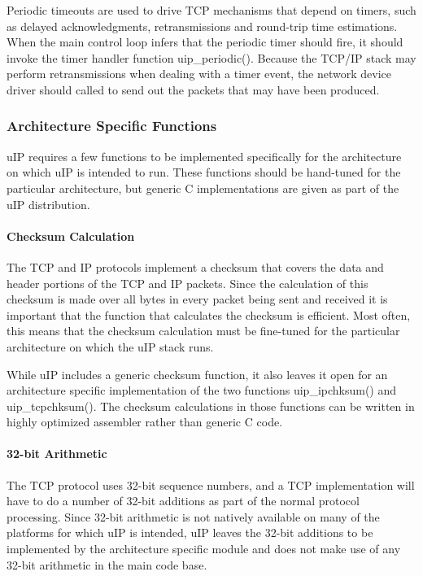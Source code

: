 \-Periodic timeouts are used to drive \-T\-C\-P mechanisms that depend on timers, such as delayed acknowledgments, retransmissions and round-\/trip time estimations. \-When the main control loop infers that the periodic timer should fire, it should invoke the timer handler function uip\-\_\-periodic(). \-Because the \-T\-C\-P/\-I\-P stack may perform retransmissions when dealing with a timer event, the network device driver should called to send out the packets that may have been produced.\hypertarget{a00060_arch}{}\subsubsection{\-Architecture Specific Functions}\label{a00060_arch}
u\-I\-P requires a few functions to be implemented specifically for the architecture on which u\-I\-P is intended to run. \-These functions should be hand-\/tuned for the particular architecture, but generic \-C implementations are given as part of the u\-I\-P distribution.\hypertarget{a00060_checksums}{}\paragraph{\-Checksum Calculation}\label{a00060_checksums}
\-The \-T\-C\-P and \-I\-P protocols implement a checksum that covers the data and header portions of the \-T\-C\-P and \-I\-P packets. \-Since the calculation of this checksum is made over all bytes in every packet being sent and received it is important that the function that calculates the checksum is efficient. \-Most often, this means that the checksum calculation must be fine-\/tuned for the particular architecture on which the u\-I\-P stack runs.

\-While u\-I\-P includes a generic checksum function, it also leaves it open for an architecture specific implementation of the two functions uip\-\_\-ipchksum() and uip\-\_\-tcpchksum(). \-The checksum calculations in those functions can be written in highly optimized assembler rather than generic \-C code.\hypertarget{a00060_longarith}{}\paragraph{32-\/bit Arithmetic}\label{a00060_longarith}
\-The \-T\-C\-P protocol uses 32-\/bit sequence numbers, and a \-T\-C\-P implementation will have to do a number of 32-\/bit additions as part of the normal protocol processing. \-Since 32-\/bit arithmetic is not natively available on many of the platforms for which u\-I\-P is intended, u\-I\-P leaves the 32-\/bit additions to be implemented by the architecture specific module and does not make use of any 32-\/bit arithmetic in the main code base.

